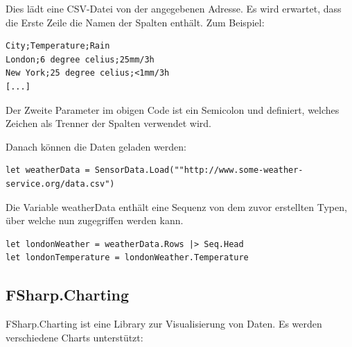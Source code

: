 Dies lädt eine CSV-Datei von der angegebenen Adresse. Es wird erwartet, dass die Erste Zeile die Namen der Spalten enthält. Zum Beispiel:

\begin{lstlisting}
City;Temperature;Rain
London;6 degree celius;25mm/3h
New York;25 degree celius;<1mm/3h
[...]
\end{lstlisting}

Der Zweite Parameter im obigen Code ist ein Semicolon und definiert, welches Zeichen als Trenner der Spalten verwendet wird.

Danach können die Daten geladen werden:
\begin{lstlisting}
let weatherData = SensorData.Load(""http://www.some-weather-service.org/data.csv")
\end{lstlisting}

Die Variable weatherData enthält eine Sequenz von dem zuvor erstellten Typen, über welche nun zugegriffen werden kann.

\begin{lstlisting}
let londonWeather = weatherData.Rows |> Seq.Head
let londonTemperature = londonWeather.Temperature
\end{lstlisting}

\subsection{FSharp.Charting}
FSharp.Charting ist eine Library zur Visualisierung von Daten. 
Es werden verschiedene Charts unterstützt:



